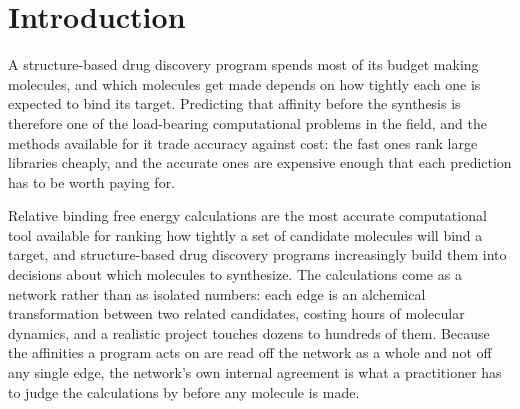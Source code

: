 \begin{abstract}
Cycle closure is the standard consistency check on a perturbation network, and what such a check
can see is fixed by the gradient--cycle decomposition of edge flows (HodgeRank): the cycle part of
a network's error is auditable and biases nothing, while the gradient part biases the affinities
and is invisible to any statistic computed from the network's own values, at any magnitude. Both
parts are measured here on $1145$ real binding edges. The auditable subspace spans a third of the
error space and, in the metric the closure statistic uses, carries under one per cent of the error
against experiment. Experimental and annotation error is per-ligand, so it falls in the invisible
part by construction and can only have made that share smaller: the measurement is a floor, and in
that metric it survives correction for that error on every system measured, at one cell as a tie.

Fitting closure against the precisions the estimator already reports turns the check into a test
with a stated null, and that test behaves as the bound predicts. It ties the standard fixed $1.0$
kcal/mol cutoff, and on every replicate the systems it flags lie inside the set that cutoff flags.
Its per-edge residuals and its ranking of systems reproduce across independent repeats; the list of
flagged systems does not. It flags nothing once the reported errors are widened by half, which is
less than published estimates of the pose and preparation variance the repeats hold fixed, and it
names no removal that recovers accuracy against experiment. Resolving the gradient part needs
measurements from outside the network, at worst one per unresolved dimension.
\end{abstract}

\section{Introduction}
A structure-based drug discovery program spends most of its budget making molecules, and which
molecules get made depends on how tightly each one is expected to bind its target. Predicting that
affinity before the synthesis is therefore one of the load-bearing computational problems in the
field, and the methods available for it trade accuracy against cost: the fast ones rank large
libraries cheaply, and the accurate ones are expensive enough that each prediction has to be worth
paying for.

Relative binding free energy calculations are the most accurate computational tool available for
ranking how tightly a set of candidate molecules will bind a target, and structure-based drug
discovery programs increasingly build them into decisions about which molecules to synthesize. The
calculations come as a network rather than as isolated numbers: each edge is an alchemical
transformation between two related candidates, costing hours of molecular dynamics, and a realistic
project touches dozens to hundreds of them. Because the affinities a program acts on are read off
the network as a whole and not off any single edge, the network's own internal agreement is what a
practitioner has to judge the calculations by before any molecule is made.

